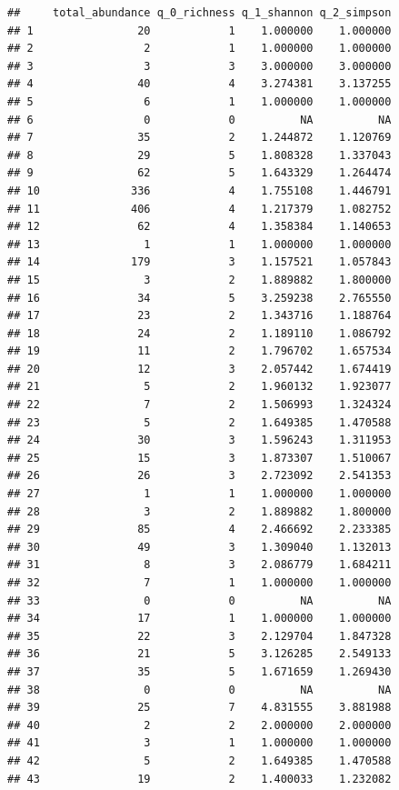 \documentclass[
]{article}
\begin{document}
\begin{verbatim}
##     total_abundance q_0_richness q_1_shannon q_2_simpson
## 1                20            1    1.000000    1.000000
## 2                 2            1    1.000000    1.000000
## 3                 3            3    3.000000    3.000000
## 4                40            4    3.274381    3.137255
## 5                 6            1    1.000000    1.000000
## 6                 0            0          NA          NA
## 7                35            2    1.244872    1.120769
## 8                29            5    1.808328    1.337043
## 9                62            5    1.643329    1.264474
## 10              336            4    1.755108    1.446791
## 11              406            4    1.217379    1.082752
## 12               62            4    1.358384    1.140653
## 13                1            1    1.000000    1.000000
## 14              179            3    1.157521    1.057843
## 15                3            2    1.889882    1.800000
## 16               34            5    3.259238    2.765550
## 17               23            2    1.343716    1.188764
## 18               24            2    1.189110    1.086792
## 19               11            2    1.796702    1.657534
## 20               12            3    2.057442    1.674419
## 21                5            2    1.960132    1.923077
## 22                7            2    1.506993    1.324324
## 23                5            2    1.649385    1.470588
## 24               30            3    1.596243    1.311953
## 25               15            3    1.873307    1.510067
## 26               26            3    2.723092    2.541353
## 27                1            1    1.000000    1.000000
## 28                3            2    1.889882    1.800000
## 29               85            4    2.466692    2.233385
## 30               49            3    1.309040    1.132013
## 31                8            3    2.086779    1.684211
## 32                7            1    1.000000    1.000000
## 33                0            0          NA          NA
## 34               17            1    1.000000    1.000000
## 35               22            3    2.129704    1.847328
## 36               21            5    3.126285    2.549133
## 37               35            5    1.671659    1.269430
## 38                0            0          NA          NA
## 39               25            7    4.831555    3.881988
## 40                2            2    2.000000    2.000000
## 41                3            1    1.000000    1.000000
## 42                5            2    1.649385    1.470588
## 43               19            2    1.400033    1.232082

\end{verbatim}
\end{document}
